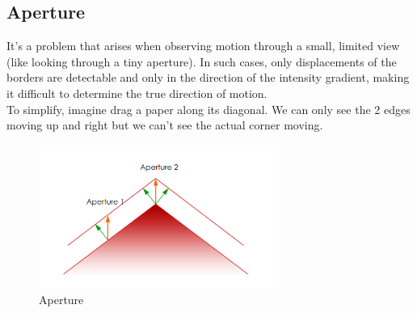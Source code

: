 \subsection{Aperture}
It's a problem that arises when observing motion through a small, limited view (like looking through a tiny aperture). 
In such cases, only displacements of the borders are detectable and only in the direction of the intensity gradient, making it difficult to determine the true direction of motion. 
\\To simplify, imagine drag a paper along its diagonal. We can only see the 2 edges moving up and right but we can't see the actual corner moving.
\begin{figure}[h]
    \centering
    \includegraphics[width=0.7\textwidth]{Figures/Aperture.png}
    \caption{Aperture}
\end{figure}
